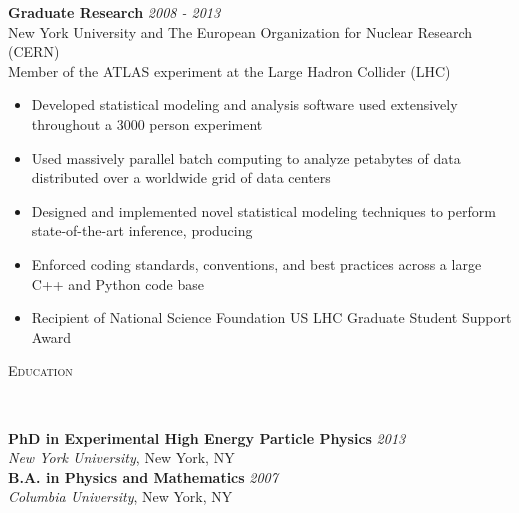 \documentclass[9pt]{article}
\newenvironment{changemargin}[2]{%
  \begin{list}{}{%
    \setlength{\topsep}{0pt}%
    \setlength{\leftmargin}{#1}%
    \setlength{\rightmargin}{#2}%
    \setlength{\listparindent}{\parindent}%
    \setlength{\itemindent}{\parindent}%
    \setlength{\parsep}{\parskip}%
  }%
  \item[]}{\end{list}
}
\newcommand{\lineover}{
  \begin{changemargin}{-0.05in}{-0.05in}
    \vspace*{-8pt}
    \hrulefill \\
    \vspace*{-2pt}
  \end{changemargin}
}
\newcommand{\header}[1]{
  \begin{changemargin}{-0.5in}{-0.5in}
    \scshape{#1}\\
    \lineover
  \end{changemargin}
}
\newenvironment{body} {
  \vspace*{-16pt}
\begin{changemargin}{-0.25in}{-0.5in}
  }
{\end{changemargin}
}
\begin{document}
\begin{body}
        \textbf{Graduate Research} \hfill \emph{2008 - 2013}\\
        New York University and The European Organization for Nuclear Research (CERN) \\
        Member of the ATLAS experiment at the Large Hadron Collider (LHC) \\

        \medskip

        \begin{itemize}

        \item Developed statistical modeling and analysis software used extensively throughout a 3000 person experiment

        \item Used massively parallel batch computing to analyze petabytes of data distributed over a worldwide grid of data centers

        \item Designed and implemented novel statistical modeling techniques to perform state-of-the-art inference, producing

        \item Enforced coding standards, conventions, and best practices across a large C++ and Python code base

        \item Recipient of National Science Foundation US LHC Graduate Student Support Award

        \end{itemize}

\end{body}

\smallskip

\header{Education}

\begin{body}
  \vspace{14pt}
  \textbf{PhD in Experimental High Energy Particle Physics }{} \hfill \emph{2013}{} \\
  \emph{New York University}, New York, NY{} \\
  \medskip
  \textbf{B.A. in Physics and Mathematics} \hfill \emph{2007} \\
  \emph{Columbia University}, New York, NY\\
\end{body}
\end{document}
